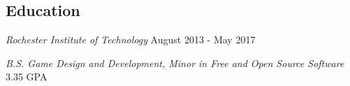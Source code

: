 \documentclass[line,margin]{res}
\begin{document}
\begin{resume}
\section{Education}
{\sl Rochester Institute of Technology} \hfill August 2013 - May 2017

{\sl B.S. Game Design and Development, Minor in Free and Open Source Software} \hfill 3.35 GPA


\end{resume}
\end{document}
